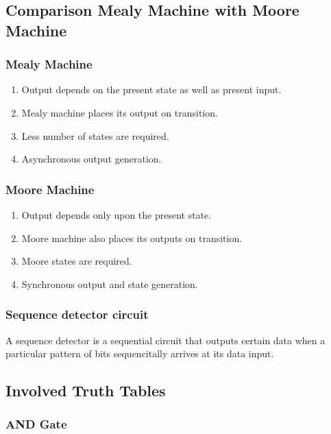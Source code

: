 \documentclass[11pt]{article}
\begin{document}
\subsection{Comparison Mealy Machine with Moore Machine}
\subsubsection{Mealy Machine}
\begin{enumerate}
	\item Output depends on the present state as well as present input. 
	\item Mealy machine places its output on transition. 
	\item Less number of states are required. 
	\item Asynchronous output generation. 
\end{enumerate}

\subsubsection{Moore Machine}
\begin{enumerate}
	\item Output depends only upon the present state.
	\item Moore machine also places its outputs on transition. 
	\item Moore states are required. 
	\item Synchronous output and state generation. 
\end{enumerate}
\subsubsection{Sequence detector circuit}

A sequence detector is a sequential circuit that outputs certain data when a particular pattern of bits sequencitally arrives at its data input. 

\subsection{Involved Truth Tables}

\subsubsection{AND Gate}
\end{document}
